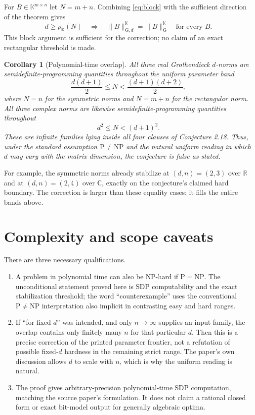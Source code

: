 \documentclass[11pt]{article}
\newtheorem{corollary}{Corollary}
\newcommand{\R}{\mathbb R}
\newcommand{\C}{\mathbb C}
\begin{document}
For $B\in\mathbb K^{m\times n}$ let $N=m+n$.  Combining \eqref{eq:block} with the
sufficient direction of the theorem gives
\begin{equation}\label{eq:rectstab}
 d\ge\rho_{\mathbb K}(N)
 \quad\Longrightarrow\quad
 \|B\|_{\mathrm G,d}^{\mathbb K}=\|B\|_{\mathrm G}^{\mathbb K}
 \quad\text{for every }B.
\end{equation}
This block argument is sufficient for the correction; no claim of an exact
rectangular threshold is made.

\begin{corollary}[Polynomial-time overlap]
All three real Grothendieck $d$-norms are semidefinite-programming quantities
throughout the uniform parameter band
\[
 \frac{d(d+1)}2\le N<\frac{(d+1)(d+2)}2,
\]
where $N=n$ for the symmetric norms and $N=m+n$ for the rectangular norm.
All three complex norms are likewise semidefinite-programming quantities
throughout
\[
 d^2\le N<(d+1)^2.
\]
These are infinite families lying inside all four clauses of Conjecture 2.18.
Thus, under the standard assumption $\mathrm P\ne\mathrm{NP}$ and the
natural uniform reading in which $d$ may vary with the matrix dimension, the
conjecture is false as stated.
\end{corollary}

For example, the symmetric norms already stabilize at $(d,n)=(2,3)$ over
$\R$ and at $(d,n)=(2,4)$ over $\C$, exactly on the conjecture's claimed
hard boundary.  The correction is larger than these equality cases: it fills
the entire bands above.

\section{Complexity and scope caveats}

There are three necessary qualifications.
\begin{enumerate}
\item A problem in polynomial time can also be NP-hard if
      $\mathrm P=\mathrm{NP}$.  The unconditional statement proved here is
      SDP computability and the exact stabilization threshold; the word
      ``counterexample'' uses the conventional $\mathrm P\ne\mathrm{NP}$
      interpretation also implicit in contrasting easy and hard ranges.
\item If ``for fixed $d$'' was intended, and only $n\to\infty$ supplies an
      input family, the overlap contains only finitely many $n$ for that
      particular $d$.  Then this is a precise correction of the printed
      parameter frontier, not a refutation of possible fixed-$d$ hardness in
      the remaining strict range.  The paper's own discussion allows $d$ to
      scale with $n$, which is why the uniform reading is natural.
\item The proof gives arbitrary-precision polynomial-time SDP computation,
      matching the source paper's formulation.  It does not claim a rational
      closed form or exact bit-model output for generally algebraic optima.
\end{enumerate}
\end{document}
